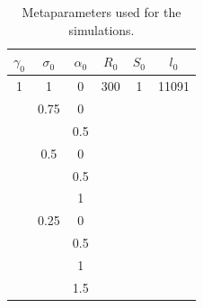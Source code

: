 \documentclass[12pt, titlepage]{report}
\begin{document}
\begin{table}[h!]
\centering
\begin{tabular}{c|c|c|c|c|c}
$\gamma_0$ & $\sigma_0$ & $\alpha_0$ & $R_0$ & $S_0$ & $l_0$ \\ \hline
1          & 1          & 0          & 300   & 1     & 11091 \\
         & 0.75       & 0          &       &       &       \\
         &            & 0.5        &       &       &       \\
         & 0.5        & 0          &       &       &       \\
         &            & 0.5        &       &       &       \\
         &            & 1          &       &       &       \\
         & 0.25       & 0          &       &       &       \\
         &            & 0.5        &       &       &       \\
         &            & 1          &       &       &       \\
         &            & 1.5        &       &       &
\end{tabular}
\caption{Metaparameters used for the simulations.} \label{eq : table metaparameters used}
\end{table}
\end{document}
